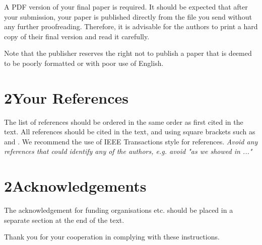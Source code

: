 \documentclass[10pt]{article}
\begin{document}
A PDF version of your final paper is required. It should
be expected that after your submission, your paper is
published directly from the file you send without any further
proofreading. Therefore, it is advisable for the authors to
print a hard copy of their final version and read it carefully.

Note that the publisher reserves the right not to publish a paper that is deemed to be poorly formatted or with poor use of English.

\section{2Your References}
The list of references should be ordered in the same order as
first cited in the text. All references should be cited in the
text, and using square brackets such as \cite{ref01} and \cite{ref01,ref02}. We
recommend the use of IEEE Transactions style for references. \textit{Avoid any references
that could identify any of the authors, e.g. avoid "as we showed in ..."}

\section*{2Acknowledgements}
The acknowledgement for funding organisations etc. should
be placed in a separate section at the end of the text.



Thank you for your cooperation in complying with these
instructions.



\end{document}
